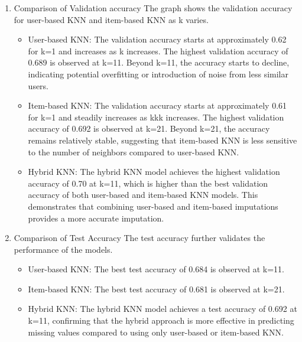 \documentclass{article}
\begin{document}
\begin{enumerate}
    \item Comparison of Validation accuracy\newline
    The graph shows the validation accuracy for user-based KNN and item-based KNN as k varies.
    \begin{itemize}
        \item User-based KNN:\newline
        The validation accuracy starts at approximately 0.62 for k=1 and increases as k increases.
        The highest validation accuracy of 0.689 is observed at k=11.
        Beyond k=11, the accuracy starts to decline, indicating potential overfitting or introduction of noise from less similar users.
        \item Item-based KNN:\newline
        The validation accuracy starts at approximately 0.61 for k=1 and steadily increases as kkk increases.
        The highest validation accuracy of 0.692 is observed at k=21.
        Beyond k=21, the accuracy remains relatively stable, suggesting that item-based KNN is less sensitive to the number of neighbors compared to user-based KNN.
        \item Hybrid KNN:\newline
        The hybrid KNN model achieves the highest validation accuracy of 0.70 at k=11, which is higher than the best validation accuracy of both user-based and item-based KNN models.
        This demonstrates that combining user-based and item-based imputations provides a more accurate imputation.
    \end{itemize}
    \item Comparison of Test Accuracy\newline
    The test accuracy further validates the performance of the models.
    \begin{itemize}
        \item User-based KNN:\newline
        The best test accuracy of 0.684 is observed at k=11.
        \item Item-based KNN:\newline
        The best test accuracy of 0.681 is observed at k=21.
        \item Hybrid KNN:\newline
        The hybrid KNN model achieves a test accuracy of 0.692 at k=11, confirming that the hybrid approach is more effective in predicting missing values compared to using only user-based or item-based KNN.

\end{itemize}
\end{enumerate}
\end{document}
